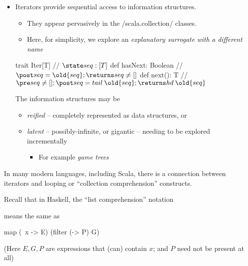 \documentclass{ip3}
\begin{document}
\begin{foil}[Iterator]
\begin{itemize} 
        \item  Iterators provide sequential access to information structures.
        \begin{itemize}
                \item  They appear pervasively in the \sc/scala.collection/ classes.
                \item  Here, for simplicity, we explore an \textit{explanatory surrogate with a different name}
        \end{itemize}
        
\begin{scala}

                trait Iter[T] {          // $\state seq: [T]$
                 def hasNext: Boolean    // $\post seq=\old{seq}; \returns seq\not=[]$
                 def next():  T          // $\pre seq\not=[]; \post seq=tail\:\old{seq}; \returns hd\:\old{seq}$
                }
\end{scala}
        \vitem  The information structures may be 
        \begin{itemize}
                \item \textit{reified} -- completely represented as data structures, or                
                \item \textit{latent} -- possibly-infinite, or gigantic -- needing to be explored incrementally                
                \begin{itemize}
                   \item For example \textit{game trees} 
                \end{itemize}
        \end{itemize}        
\end{itemize}
\begin{note}
In many modern languages, including Scala, there is a connection between 
iterators and looping or ``collection comprehension'' constructs.

Recall that in Haskell, the ``list comprehension'' notation
\begin{scala}
        [ E | x<-G, P]
\end{scala}
means the same as
\begin{scala}
        map (\ x -> E) (filter (\x -> P) G)
\end{scala}
(Here $E, G, P$ are expressions that (can) contain $x$; and $P$ need not be present at all)
 

\end{note}
\end{foil}
\end{document}
